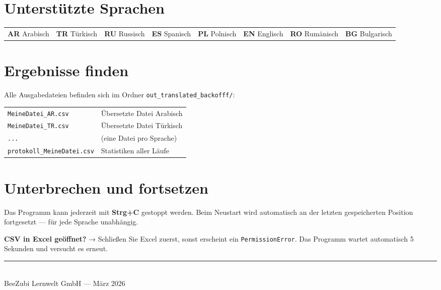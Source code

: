 \documentclass[a4paper,11pt]{article}
\newenvironment{hinweisbox}{%
  \begin{mdframed}[backgroundcolor=hinweis,linecolor=hinweisrand,linewidth=1pt,
    innerleftmargin=8pt,innerrightmargin=8pt,innertopmargin=5pt,innerbottommargin=5pt]
  \small}{\end{mdframed}}
\begin{document}
\section{Unterstützte Sprachen}

\begin{tabular}{@{}llllllll@{}}
\textbf{AR} Arabisch &
\textbf{TR} Türkisch &
\textbf{RU} Russisch &
\textbf{ES} Spanisch &
\textbf{PL} Polnisch &
\textbf{EN} Englisch &
\textbf{RO} Rumänisch &
\textbf{BG} Bulgarisch \\
\end{tabular}

\section{Ergebnisse finden}

Alle Ausgabedateien befinden sich im Ordner \texttt{out\_translated\_backofff/}:

\begin{tabular}{@{}ll@{}}
\texttt{MeineDatei\_AR.csv} & Übersetzte Datei Arabisch \\
\texttt{MeineDatei\_TR.csv} & Übersetzte Datei Türkisch \\
\texttt{...} & (eine Datei pro Sprache) \\
\texttt{protokoll\_MeineDatei.csv} & Statistiken aller Läufe \\
\end{tabular}

\section{Unterbrechen und fortsetzen}

Das Programm kann jederzeit mit \textbf{Strg+C} gestoppt werden.
Beim Neustart wird automatisch an der letzten gespeicherten Position fortgesetzt —
für jede Sprache unabhängig.

\begin{hinweisbox}
\textbf{CSV in Excel geöffnet?} → Schließen Sie Excel zuerst, sonst erscheint ein
\texttt{PermissionError}. Das Programm wartet automatisch 5 Sekunden und versucht es erneut.
\end{hinweisbox}

\vspace{1em}
\begin{center}
\rule{0.5\linewidth}{0.4pt}\\[0.3em]
{\small\color{grau}BeeZubi Lernwelt GmbH — März 2026}
\end{center}
\end{document}
